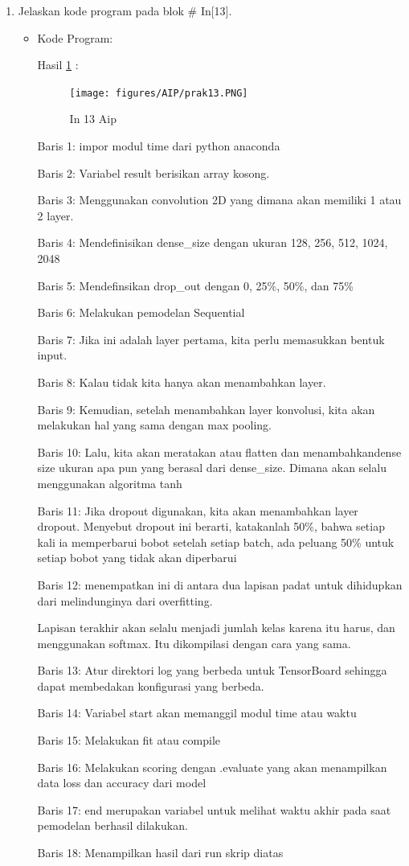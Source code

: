 \begin{enumerate}
\item Jelaskan kode program pada blok \# In[13].
\begin{itemize}
\item Kode Program:

\par Hasil \ref{in13aip} :
\begin{figure}[!hbtp]
\centering
\texttt{[image: figures/AIP/prak13.PNG]}
\caption{In 13 Aip}
\label{in13aip}
\end{figure}
\par Baris 1: impor modul time dari python anaconda
\par Baris 2: Variabel result berisikan array kosong.
\par Baris 3: Menggunakan convolution 2D yang dimana akan memiliki 1 atau 2 layer.
\par Baris 4: Mendefinisikan dense\_size dengan ukuran 128, 256, 512, 1024, 2048
\par Baris 5: Mendefinsikan drop\_out dengan 0, 25\%, 50\%, dan 75\%
\par Baris 6:  Melakukan pemodelan Sequential
\par Baris 7: Jika ini adalah layer pertama, kita perlu memasukkan bentuk input.
\par Baris 8: Kalau tidak kita hanya akan menambahkan layer.
\par Baris 9: Kemudian, setelah menambahkan layer konvolusi, kita akan melakukan hal yang sama dengan max pooling.
\par Baris 10: Lalu, kita akan meratakan atau flatten dan menambahkandense size ukuran apa pun yang berasal dari dense\_size. Dimana akan selalu menggunakan algoritma tanh
\par Baris 11: Jika dropout digunakan, kita akan menambahkan layer dropout. Menyebut dropout ini berarti, katakanlah 50\%, bahwa setiap kali ia memperbarui bobot setelah setiap batch, ada peluang 50\% untuk setiap bobot yang tidak akan diperbarui
\par Baris 12: menempatkan ini di antara dua lapisan padat untuk dihidupkan dari melindunginya dari overfitting.
\par Lapisan terakhir akan selalu menjadi jumlah kelas karena itu harus, dan menggunakan softmax. Itu dikompilasi dengan cara yang sama.
\par Baris 13: Atur direktori log yang berbeda untuk TensorBoard sehingga dapat membedakan konfigurasi yang berbeda.
\par Baris 14: Variabel start akan memanggil modul time atau waktu
\par Baris 15: Melakukan fit atau compile 
\par Baris 16: Melakukan scoring dengan .evaluate yang akan menampilkan data loss dan accuracy dari model
\par Baris 17:  end merupakan variabel untuk melihat waktu akhir pada saat pemodelan berhasil dilakukan.
\par Baris 18:  Menampilkan hasil dari run skrip diatas 
\end{itemize}
\par


\end{enumerate}

